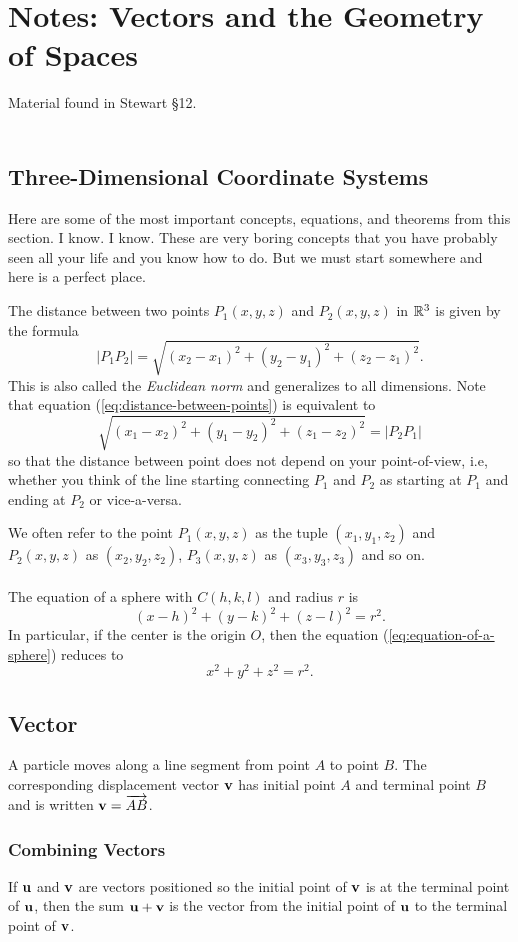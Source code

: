 \chapter{Notes: Vectors and the Geometry of Spaces}
Material found in Stewart \S12.
\\\\
\section{Three-Dimensional Coordinate Systems}
Here are some of the most important concepts, equations, and theorems from
this section. I know. I know. These are very boring concepts that you have
probably seen all your life and you know how to do. But we must start
somewhere and here is a perfect place.

The distance between two points $P_1(x,y,z)$ and $P_2(x,y,z)$ in $\mathbb{R}^3$
is given by the formula
\begin{equation}
  \label{eq:distance-between-points}
|P_1P_2|=\sqrt{(x_2-x_1)^2+(y_2-y_1)^2+(z_2-z_1)^2}.
\end{equation}
This is also called the \emph{Euclidean norm} and generalizes to all
dimensions. Note that equation (\ref{eq:distance-between-points}) is
equivalent to
\[
\sqrt{(x_1-x_2)^2+(y_1-y_2)^2+(z_1-z_2)^2}=|P_2P_1|
\]
so that the distance between point does not depend on your point-of-view,
i.e, whether you think of the line starting connecting $P_1$ and $P_2$ as
starting at $P_1$ and ending at $P_2$ or vice-a-versa.

We often refer to the point $P_1(x,y,z)$ as the tuple $(x_1,y_1,z_2)$ and
$P_2(x,y,z)$ as $(x_2,y_2,z_2)$, $P_3(x,y,z)$ as $(x_3,y_3,z_3)$ and so on.
\\\\
The equation of a sphere with $C(h,k,l)$ and radius $r$ is
\begin{equation}
  \label{eq:equation-of-a-sphere}
(x-h)^2+(y-k)^2+(z-l)^2=r^2.
\end{equation}
In particular, if the center is the origin $O$, then the equation
(\ref{eq:equation-of-a-sphere}) reduces to
\[
x^2+y^2+z^2=r^2.
\]
\section{Vector}
A particle moves along a line segment from point $A$ to point $B$. The
corresponding displacement vector $\mathbf{v}$ has initial point $A$ and terminal
point $B$ and is written $\mathbf{v}=\overrightarrow{AB}$.
\subsection{Combining Vectors}
If $\mathbf{u}$ and $\mathbf{v}$ are vectors positioned so the initial point of $\mathbf{v}$
is at the terminal point of $\mathbf{u}$, then the sum $\mathbf{u}+\mathbf{v}$ is the vector
from the initial point of $\mathbf{u}$ to the terminal point of $\mathbf{v}$.

